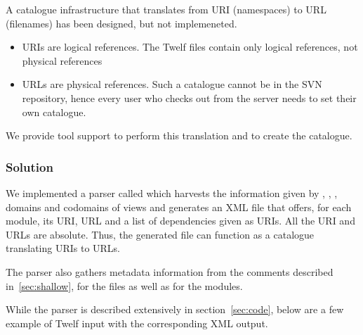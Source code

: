 A catalogue infrastructure that translates from URI (namespaces) to URL (filenames) has been designed, but not implemeneted. 

\begin{itemize}
\item URIs are logical references. The Twelf files contain only logical references, not physical references
\item URLs are physical references. Such a catalogue cannot be in the SVN repository, hence every user who checks out from the server needs to set their own catalogue.
\end{itemize}

We provide tool support to perform this translation and to create the catalogue.

\subsubsection{Solution}

We implemented a parser called  which harvests the information given by , , , domains and codomains of views and generates an XML file that offers, for each module, its URI, URL and a list of dependencies given as URIs. All the URI and URLs are absolute. Thus, the generated file can function as a catalogue translating URIs to URLs.

The parser also gathers metadata information from the comments described in~\ref{sec:shallow}, for the files as well as for the modules.

While the parser is described extensively in section~\ref{sec:code}, below are a few example of Twelf input with the corresponding XML output.

